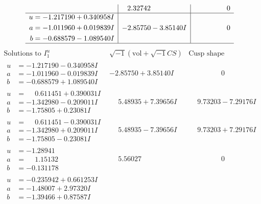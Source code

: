 \documentclass[1p]{elsarticle_modified}
\theoremstyle{definition}
\newcommand{\I}{\sqrt{-1}}
\begin{document}
$$\begin{array}{c|c|c}
 & \phantom{-}2.32742\phantom{ +0.000000I} & \phantom{-0.000000 } 0 \\ \hline\begin{aligned}
u &= -1.217190 + 0.340958 I \\
a &= -1.011960 + 0.019839 I \\
b &= -0.688579 - 1.089540 I\end{aligned}
 & -2.85750 - 3.85140 I & \phantom{-0.000000 } 0\\
 \hline 
 \end{array}$$\newpage$$\begin{array}{c|c|c}  
\text{Solutions to }I^u_{1}& \I (\text{vol} + \sqrt{-1}CS) & \text{Cusp shape}\\
 \hline 
\begin{aligned}
u &= -1.217190 - 0.340958 I \\
a &= -1.011960 - 0.019839 I \\
b &= -0.688579 + 1.089540 I\end{aligned}
 & -2.85750 + 3.85140 I & \phantom{-0.000000 } 0 \\ \hline\begin{aligned}
u &= \phantom{-}0.611451 + 0.390031 I \\
a &= -1.342980 - 0.209011 I \\
b &= -1.75805 + 0.23081 I\end{aligned}
 & \phantom{-}5.48935 + 7.39656 I & \phantom{-}9.73203 - 7.29176 I \\ \hline\begin{aligned}
u &= \phantom{-}0.611451 - 0.390031 I \\
a &= -1.342980 + 0.209011 I \\
b &= -1.75805 - 0.23081 I\end{aligned}
 & \phantom{-}5.48935 - 7.39656 I & \phantom{-}9.73203 + 7.29176 I \\ \hline\begin{aligned}
u &= -1.28941\phantom{ +0.000000I} \\
a &= \phantom{-}1.15132\phantom{ +0.000000I} \\
b &= -0.131178\phantom{ +0.000000I}\end{aligned}
 & \phantom{-}5.56027\phantom{ +0.000000I} & \phantom{-0.000000 } 0 \\ \hline\begin{aligned}
u &= -0.235942 + 0.661253 I \\
a &= -1.48007 + 2.97320 I \\
b &= -1.39466 + 0.87587 I\end{aligned}

\end{array}$$
\end{document}
